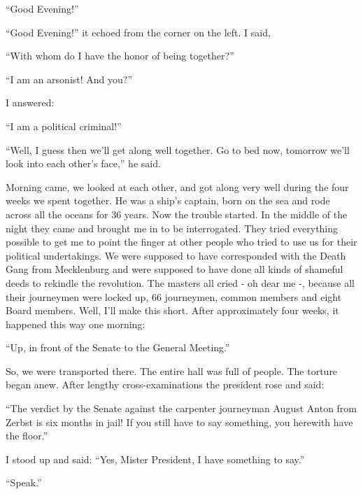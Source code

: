 \documentclass{article}
\begin{document}
``Good Evening!''

``Good Evening!'' it echoed from the corner on the left. I said,

``With whom do I have the honor of being together?''

``I am an arsonist! And you?''

I answered:

``I am a political criminal!''

``Well, I guess then we'll get along well together. Go to bed now, tomorrow we'll look into each other's face,'' he said.

Morning came, we looked at each other, and got along very well during the four weeks we spent together. He was a ship's captain, born on the sea and rode across all the oceans for 36 years. Now the trouble started. In the middle of the night they came and brought me in to be interrogated. They tried everything possible to get me to point the finger at other people who tried to use us for their political undertakings. We were supposed to have corresponded with the Death Gang from Mecklenburg and were supposed to have done all kinds of shameful deeds to rekindle the revolution. The masters all cried - oh dear me -, because all their journeymen were locked up, 66 journeymen, common members and eight Board members. Well, I'll make this short. After approximately four weeks, it happened this way one morning:

``Up, in front of the Senate to the General Meeting.''

So, we were transported there. The entire hall was full of people. The torture began anew. After lengthy cross-examinations the president rose and said:

``The verdict by the Senate against the carpenter journeyman August Anton from Zerbst is six months in jail! If you still have to say something, you herewith have the floor.''

I stood up and said: ``Yes, Mister President, I have something to say.''

``Speak.''
\end{document}
